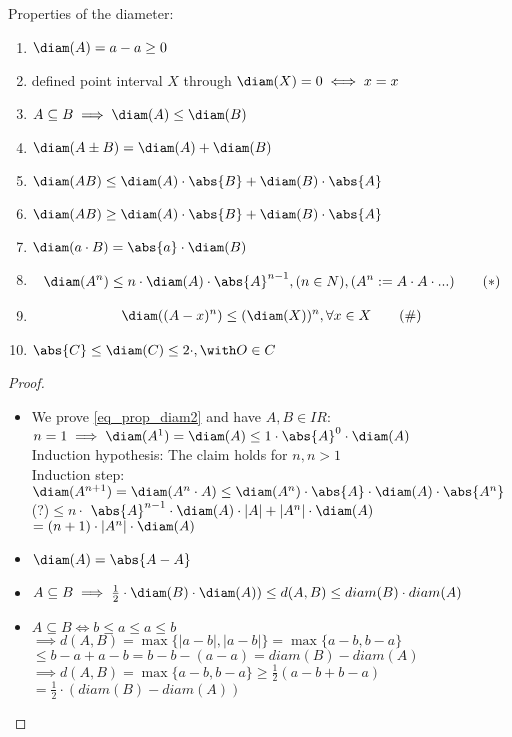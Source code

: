 \begin{proposition}
	Properties of the diameter:
	\begin{enumerate}
		\item $\diam(A)=a-a\ge 0$
		\item defined point interval $X$ through $\diam(X)=0 \iff x=x$
		\item $A\subseteq B \implies \diam(A)\le \diam(B)$
		\item $\diam(A\pm B)=\diam(A)+\diam(B)$ 
		\item $\diam(AB)\le \diam(A)\cdot\abs{B}+\diam(B)\cdot\abs{A}$
		\item $\diam(AB)\ge \diam(A)\cdot\abs{B}+\diam(B)\cdot\abs{A}$
		\item $\diam(a\cdot B)=\abs{a}\cdot \diam(B)$
		\item \begin{align*}
			\diam(A^n)\le n\cdot\diam(A)\cdot \abs{A}^{n-1}, (n\in N), (A^n:=A\cdot A\cdot ...) \tag{$\ast$}\label{eq_prop_diam}
		\end{align*}
		\item
		\begin{align*}
			\diam((A-x)^n)\le(\diam(X))^n, \forall x\in X
			\tag{$\#$}\label{eq_prop_diam2}	
		\end{align*}
		\item $\abs{C}\le\diam(C)\le 2\cdot , \with O\in C$ 
	\end{enumerate}
\end{proposition}
\begin{proof}
	\begin{itemize}
		\item We prove \eqref{eq_prop_diam2} and have $A,B\in IR$:\\
		$n=1 \implies \diam(A^1)=\diam(A)\le 1\cdot \abs{A}^0\cdot\diam(A)$ \\
		Induction hypothesis: The claim holds for $n, n>1$ \\
		Induction step: $\diam(A^{n+1})=\diam(A^n\cdot A)\le \diam(A^n)\cdot\abs{A}\cdot\diam(A)\cdot\abs{A^n}$ \\
		(?)$\le n\cdot$  $\abs{A}^{n-1}\cdot\diam(A)\cdot|A|+|A^n|\cdot\diam(A)$ \\
		$=(n+1)\cdot|A^n|\cdot\diam(A)$ \\
		\item $\diam(A)=\abs{A-A}$
		\item $A\subseteq B \implies \frac{1}{2}\cdot \diam(B)\cdot\diam(A))\le d(A,B)\le diam(B)\cdot diam(A)$
		\item  $A \subseteq B\iff b\le a\le a\le b$ \\
		$\implies d(A,B)=\max\{|a-b|,|a-b|\}=\max\{a-b,b-a\}$ \\
		$\le b-a+a-b=b-b-(a-a)=diam(B)-diam(A)$ \\
		$\implies d(A,B)=\max\{a-b,b-a\}\ge \frac{1}{2}(a-b+b-a)$ \\
		$=\frac{1}{2}\cdot(diam(B)-diam(A))$
	\end{itemize}
\end{proof}
